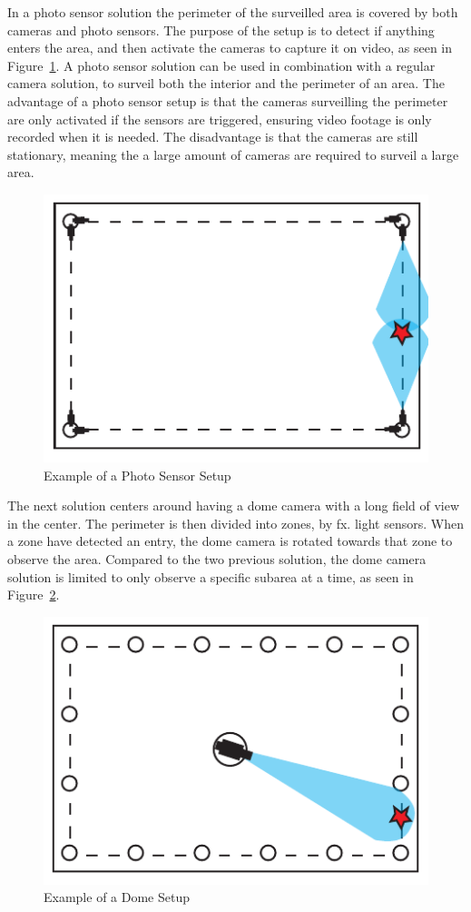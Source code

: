 In a photo sensor solution the perimeter of the surveilled area is covered by both cameras and photo sensors.
The purpose of the setup is to detect if anything enters the area, and then activate the cameras to capture it on video, as seen in Figure~\ref{fig:photo_sensor}.
A photo sensor solution can be used in combination with a regular camera solution, to surveil both the interior and the perimeter of an area.
The advantage of a photo sensor setup is that the cameras surveilling the perimeter are only activated if the sensors are triggered, ensuring video footage is only recorded when it is needed.
The disadvantage is that the cameras are still stationary, meaning the a large amount of cameras are required to surveil a large area. \\

\begin{figure}[htb]
    \centering
    \includegraphics[width=\textwidth]{gfx/light_sensor.pdf}
    \caption{Example of a Photo Sensor Setup}
    \label{fig:photo_sensor}
\end{figure}

The next solution centers around having a dome camera with a long field of view in the center.
The perimeter is then divided into zones, by fx. light sensors.
When a zone have detected an entry, the dome camera is rotated towards that zone to observe the area.
Compared to the two previous solution, the dome camera solution is limited to only observe a specific subarea at a time, as seen in Figure~\ref{fig:drone_sensor}. \\

\begin{figure}[htb]
    \centering
    \includegraphics[width=\textwidth]{gfx/drome_sensor.pdf}
    \caption{Example of a Dome Setup}
    \label{fig:drone_sensor}
\end{figure}
